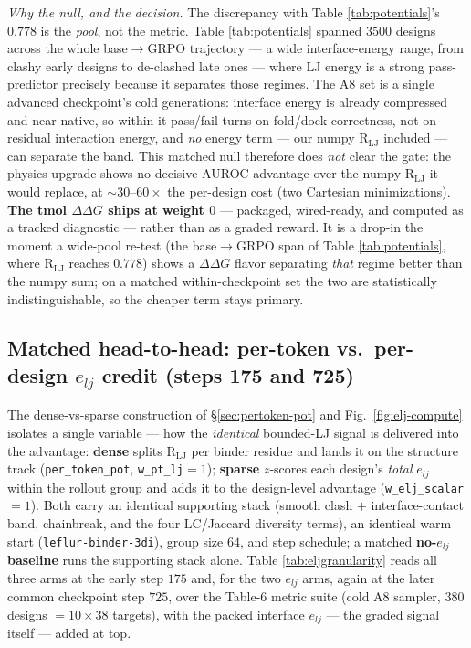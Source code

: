 \documentclass[11pt]{article}
\newcommand{\R}{\mathrm{R}}
\newcommand{\ttk}[1]{\texttt{\small #1}}
\begin{document}
\emph{Why the null, and the decision.} The discrepancy with Table \ref{tab:potentials}'s $0.778$ is
the \emph{pool}, not the metric. Table \ref{tab:potentials} spanned $3500$ designs across the whole
base$\rightarrow$GRPO trajectory --- a wide interface-energy range, from clashy early designs to
de-clashed late ones --- where LJ energy is a strong pass-predictor precisely because it separates
those regimes. The A8 set is a single advanced checkpoint's cold generations: interface energy is
already compressed and near-native, so within it pass/fail turns on fold/dock correctness, not on
residual interaction energy, and \emph{no} energy term --- our numpy $\R_{\mathrm{LJ}}$ included ---
can separate the band. This matched null therefore does \emph{not} clear the gate: the physics
upgrade shows no decisive AUROC advantage over the numpy $\R_{\mathrm{LJ}}$ it would replace, at
$\sim\!30$--$60\times$ the per-design cost (two Cartesian minimizations). \textbf{The tmol
$\Delta\Delta G$ ships at weight $0$} --- packaged, wired-ready, and computed as a tracked diagnostic
--- rather than as a graded reward. It is a drop-in the moment a wide-pool re-test (the
base$\rightarrow$GRPO span of Table \ref{tab:potentials}, where $\R_{\mathrm{LJ}}$ reaches $0.778$)
shows a $\Delta\Delta G$ flavor separating \emph{that} regime better than the numpy sum; on a matched
within-checkpoint set the two are statistically indistinguishable, so the cheaper term stays primary.

\subsection{Matched head-to-head: per-token vs.\ per-design \texorpdfstring{$e_{lj}$}{e\_lj} credit (steps 175 and 725)}
\label{sec:elj-granularity}
The dense-vs-sparse construction of \S\ref{sec:pertoken-pot} and Fig.\ \ref{fig:elj-compute} isolates a
single variable --- how the \emph{identical} bounded-LJ signal is delivered into the advantage:
\textbf{dense} splits $\R_{\mathrm{LJ}}$ per binder residue and lands it on the structure track
(\ttk{per\_token\_pot}, \ttk{w\_pt\_lj}$=1$); \textbf{sparse} $z$-scores each design's \emph{total}
$e_{lj}$ within the rollout group and adds it to the design-level advantage (\ttk{w\_elj\_scalar}$=1$).
Both carry an identical supporting stack (smooth clash $+$ interface-contact band, chainbreak, and the
four $\mathrm{LC}$/Jaccard diversity terms), an identical warm start (\ttk{leflur-binder-3di}), group
size $64$, and step schedule; a matched \textbf{no-$e_{lj}$ baseline} runs the supporting stack alone.
Table \ref{tab:eljgranularity} reads all three arms at the early step $175$ and, for the two $e_{lj}$
arms, again at the later common checkpoint step $725$, over the Table-6 metric suite (cold A8 sampler,
$380$ designs $=10\times38$ targets), with the packed interface $e_{lj}$ --- the graded signal itself
--- added at top.
\end{document}

